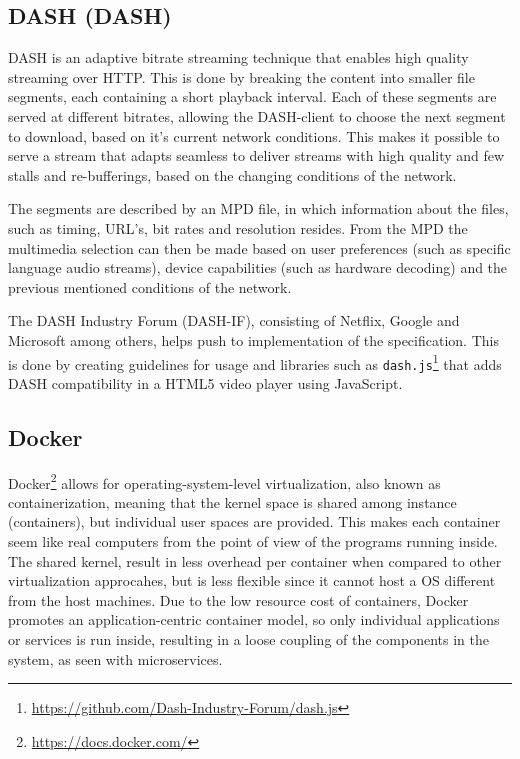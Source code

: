\subsection{\acl{DASH} (\acs{DASH})}
\ac{DASH} is an adaptive bitrate streaming technique that enables high quality streaming over \acs{HTTP}. This is done by breaking the content into smaller file segments, each containing a short playback interval. Each of these segments are served at different bitrates, allowing the \acs{DASH}-client to choose the next segment to download, based on it's current network conditions.
This makes it possible to serve a stream that adapts seamless to deliver streams with high quality and few stalls and re-bufferings, based on the changing conditions of the network.

The segments are described by an \ac{MPD} file, in which information about the files, such as timing, \acs{URL}'s, bit rates and resolution resides. From the \acs{MPD} the multimedia selection can then be made based on user preferences (such as specific language audio streams), device capabilities (such as hardware decoding) and the previous mentioned conditions of the network.

The DASH Industry Forum (DASH-IF), consisting of Netflix, Google and Microsoft among others, helps push to implementation of the specification\cite{ISO23009}. This is done by creating guidelines for usage and libraries such as \texttt{dash.js}\footnote{\url{https://github.com/Dash-Industry-Forum/dash.js}} that adds DASH compatibility in a HTML5 video player using JavaScript.

\subsection{Docker}
Docker\footnote{\url{https://docs.docker.com/}} allows for operating-system-level virtualization, also known as containerization, meaning that the kernel space is shared among instance (containers), but individual user spaces are provided. This makes each container seem like real computers from the point of view of the programs running inside. 
The shared kernel, result in less overhead per container when compared to other virtualization approcahes, but is less flexible since it cannot host a \acs{OS} different from the host machines. Due to the low resource cost of containers, Docker promotes an application-centric container model\cite{merkel2014docker}, so only individual applications or services is run inside, resulting in a loose coupling of the components in the system, as seen with microservices. 

